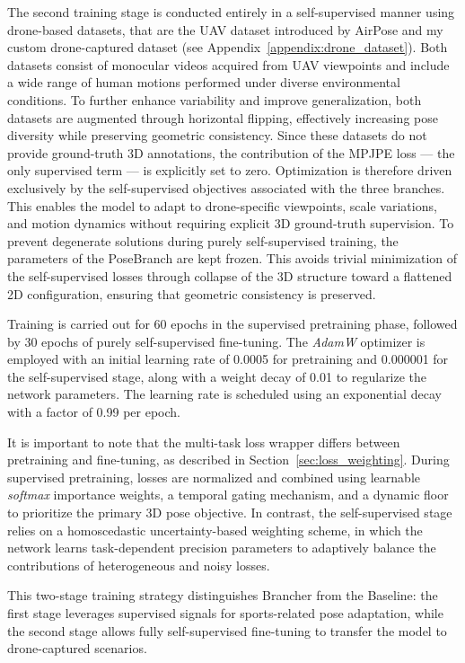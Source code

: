 The second training stage is conducted entirely in a self-supervised manner using drone-based datasets, that are the UAV dataset introduced by AirPose \cite{saini2022airpose} and my custom drone-captured dataset 
(see Appendix~\ref{appendix:drone_dataset}). Both datasets consist of monocular videos acquired from UAV viewpoints and include a wide range of human motions performed under diverse environmental conditions.
To further enhance variability and improve generalization, both datasets are augmented through horizontal flipping, effectively increasing pose diversity while preserving geometric consistency.
Since these datasets do not provide ground-truth 3D annotations, the contribution of the MPJPE loss — the only supervised term — is explicitly set to zero. Optimization is therefore driven exclusively by the self-supervised objectives 
associated with the three branches. This enables the model to adapt to drone-specific viewpoints, scale variations, and motion dynamics without requiring explicit 3D ground-truth supervision.
To prevent degenerate solutions during purely self-supervised training, the parameters of the PoseBranch are kept frozen. This avoids trivial minimization of the self-supervised losses through collapse of the 3D structure toward a 
flattened 2D configuration, ensuring that geometric consistency is preserved.

Training is carried out for 60 epochs in the supervised pretraining phase, followed by 30 epochs of purely self-supervised fine-tuning. 
The \textit{AdamW} optimizer is employed with an initial learning rate of 0.0005 for pretraining and 0.000001 for the self-supervised stage, along with a weight decay of 0.01 to regularize the network parameters. The learning rate is 
scheduled using an exponential decay with a factor of 0.99 per epoch.  

It is important to note that the multi-task loss wrapper differs between pretraining and fine-tuning, as described in Section~\ref{sec:loss_weighting}. During supervised pretraining, losses are normalized and combined using learnable 
\textit{softmax} importance weights, a temporal gating mechanism, and a dynamic floor to prioritize the primary 3D pose objective. In contrast, the self-supervised stage relies on a homoscedastic uncertainty-based weighting scheme, 
in which the network learns task-dependent precision parameters to adaptively balance the contributions of heterogeneous and noisy losses.

This two-stage training strategy distinguishes Brancher from the Baseline: the first stage leverages supervised signals for sports-related pose adaptation, while the second stage allows fully self-supervised fine-tuning to transfer 
the model to drone-captured scenarios.



